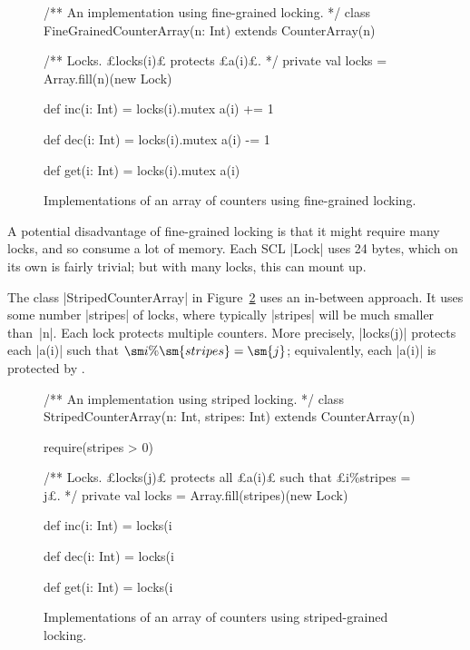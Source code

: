 
\begin{figure}
\begin{scala}
/** An implementation using fine-grained locking. */
class FineGrainedCounterArray(n: Int) extends CounterArray(n){
  /** Locks.  £locks(i)£ protects £a(i)£. */
  private val locks = Array.fill(n)(new Lock)

  def inc(i: Int) = locks(i).mutex{ a(i) += 1 }

  def dec(i: Int) = locks(i).mutex{ a(i) -= 1 }

  def get(i: Int) = locks(i).mutex{ a(i) }
}
\end{scala}
\caption{Implementations of an array of counters using fine-grained locking.}
\label{fig:FineGrainedCounterArray}
\end{figure}


A potential disadvantage of fine-grained locking is that it might require many
locks, and so consume a lot of memory.  Each SCL |Lock| uses 24 bytes, which
on its own is fairly trivial; but with many locks, this can mount up.  

The class |StripedCounterArray| in Figure~\ref{fig:StripedCounterArray} uses
an in-between approach.  It uses some number |stripes| of locks, where
typically |stripes| will be much smaller than~|n|.  Each lock protects
multiple counters.  More precisely, |locks(j)| protects each |a(i)| such that
$\sm i \% \sm{stripes} = \sm{j}$; equivalently, each |a(i)| is protected by
.


\begin{figure}
\begin{scala}
/** An implementation using striped locking. */
class StripedCounterArray(n: Int, stripes: Int) extends CounterArray(n){
  require(stripes > 0)

  /** Locks.  £locks(j)£ protects all £a(i)£ such that £i\%stripes = j£. */
  private val locks = Array.fill(stripes)(new Lock)

  def inc(i: Int) = locks(i%

  def dec(i: Int) = locks(i%

  def get(i: Int) = locks(i%
}
\end{scala}
\caption{Implementations of an array of counters using striped-grained locking.}
\label{fig:StripedCounterArray}
\end{figure}

